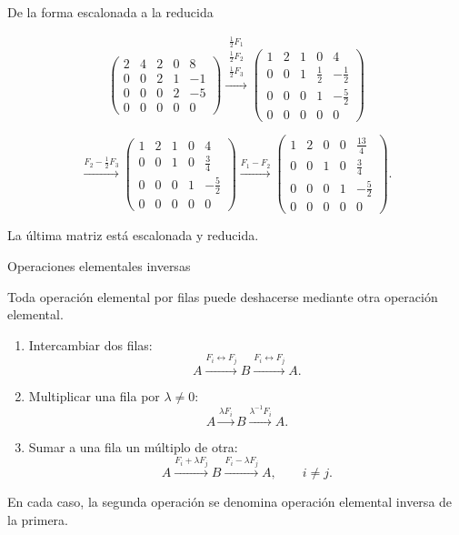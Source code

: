 \begin{frame}[allowframebreaks]{De la forma escalonada a la reducida}

\[
\begin{pmatrix}
2&4&2&0&8\\
0&0&2&1&-1\\
0&0&0&2&-5\\
0&0&0&0&0
\end{pmatrix}
\xrightarrow{\substack{
\frac12F_1\\
\frac12F_2\\
\frac12F_3
}}
\begin{pmatrix}
1&2&1&0&4\\
0&0&1&\frac12&-\frac12\\
0&0&0&1&-\frac52\\
0&0&0&0&0
\end{pmatrix}
\]

\[
\xrightarrow{
F_2-\frac12F_3
}
\begin{pmatrix}
1&2&1&0&4\\
0&0&1&0&\frac34\\
0&0&0&1&-\frac52\\
0&0&0&0&0
\end{pmatrix}
\xrightarrow{
F_1-F_2
}
\begin{pmatrix}
1&2&0&0&\frac{13}{4}\\
0&0&1&0&\frac34\\
0&0&0&1&-\frac52\\
0&0&0&0&0
\end{pmatrix}.
\]

La última matriz está escalonada y reducida.

\end{frame}

\begin{frame}{Operaciones elementales inversas}

Toda operación elemental por filas puede \alert{deshacerse}
mediante otra operación elemental.

\medskip

\begin{enumerate}

\item Intercambiar dos filas:
\[
A
\xrightarrow{F_i\leftrightarrow F_j}
B
\xrightarrow{F_i\leftrightarrow F_j}
A.
\]

\item Multiplicar una fila por \(\lambda\neq0\):
\[
A
\xrightarrow{\lambda F_i}
B
\xrightarrow{\lambda^{-1}F_i}
A.
\]

\item Sumar a una fila un múltiplo de otra:
\[
A
\xrightarrow{F_i+\lambda F_j}
B
\xrightarrow{F_i-\lambda F_j}
A,
\qquad i\neq j.
\]

\end{enumerate}

\medskip

En cada caso, la segunda operación se denomina
\alert{operación elemental inversa} de la primera.

\end{frame}

